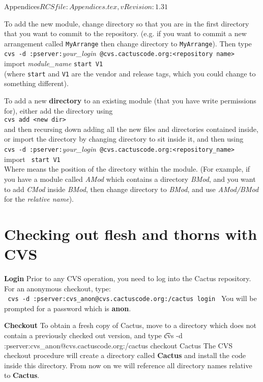 \begin{cactuspart}{6}{Appendices}{$RCSfile: Appendices.tex,v $}{$Revision: 1.31 $}
\begin{description}
To add the new module, change directory so that you are in the first directory
that you want to commit to the repository. (e.g. if you want to commit
a new arrangement called {\tt MyArrange} then change directory to
{\tt MyArrange}). Then type\\
{\tt cvs -d :pserver:}{\em your\_login}{\tt
@cvs.cactuscode.org:<repository name> } import {\em module\_name} {\tt start V1}\\
(where {\tt start} and {\tt V1} are the vendor and release tags, which you could change to something different).

To add a new {\bf directory} {\tt <new dir>} to an existing module (that you have write permissions for), either add the directory using\\
{\tt cvs add <new dir>}\\
and then recursing down adding all the new files and directories contained
inside, or import the directory by changing directory to sit inside it, and then using\\
{\tt cvs -d :pserver:}{\em your\_login}{\tt
@cvs.cactuscode.org:<repository\_name> } import {\tt <relative name> start V1}\\
Where {\tt <relative name>} means the position of the directory within the module. (For example, if you have a module called {\em AMod} which contains a
directory {\em BMod}, and you want to add {\em CMod} inside {\em BMod}, then change directory to {\em BMod}, and use {\em AMod/BMod} for the {\em relative name}).


\end{description}

\section{Checking out flesh and thorns with CVS}

\begin{Lentry}
\item[{\bf Login}] Prior to any CVS operation, you need to log into the Cactus
  repository. For an anonymous checkout, type:\\
  {\tt
    cvs -d :pserver:cvs\_anon@cvs.cactuscode.org:/cactus login
    }
  You will be prompted for a password which is {\bf anon}.
\item[{\bf Checkout}] To obtain a fresh copy of Cactus, move to a directory
  which does not contain a previously checked out version, and type
  {\t
    cvs -d :pserver:cvs\_anon@cvs.cactuscode.org:/cactus checkout Cactus
    }
  The CVS checkout procedure will create a directory called {\bf
  Cactus} and install the code inside this directory.  From now on we
  will reference all directory names relative to {\bf Cactus}.


\end{Lentry}
\end{cactuspart}
